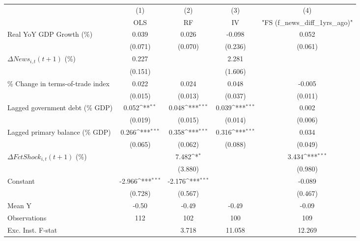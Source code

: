 {
\def\sym#1{\ifmmode^{#1}\else\(^{#1}\)\fi}
\begin{tabular}{l*{4}{c}}
\toprule
                    &\multicolumn{1}{c}{(1)}&\multicolumn{1}{c}{(2)}&\multicolumn{1}{c}{(3)}&\multicolumn{1}{c}{(4)}\\
                    &\multicolumn{1}{c}{OLS}&\multicolumn{1}{c}{RF}&\multicolumn{1}{c}{IV}&\multicolumn{1}{c}{ "FS (f_news_diff_1yrs_ago)" }\\
\midrule
Real YoY GDP Growth (\%)&       0.039         &       0.026         &      -0.098         &       0.052         \\
                    &     (0.071)         &     (0.070)         &     (0.236)         &     (0.061)         \\
\addlinespace
$ \Delta News_{i,t}(t+1)$ (\%)&       0.227         &                     &       2.281         &                     \\
                    &     (0.151)         &                     &     (1.606)         &                     \\
\addlinespace
\% Change in terms-of-trade index&       0.022         &       0.024         &       0.048         &      -0.005         \\
                    &     (0.015)         &     (0.013)         &     (0.037)         &     (0.011)         \\
\addlinespace
Lagged government debt (\% GDP)&       0.052\sym{**} &       0.048\sym{***}&       0.039\sym{***}&       0.002         \\
                    &     (0.019)         &     (0.015)         &     (0.014)         &     (0.006)         \\
\addlinespace
Lagged primary balance (\% GDP)&       0.266\sym{***}&       0.358\sym{***}&       0.316\sym{***}&       0.034         \\
                    &     (0.065)         &     (0.062)         &     (0.088)         &     (0.049)         \\
\addlinespace
$ \Delta FctShock_{i,t}(t+1)$ (\%)&                     &       7.482\sym{*}  &                     &       3.434\sym{***}\\
                    &                     &     (3.880)         &                     &     (0.980)         \\
\addlinespace
Constant            &      -2.966\sym{***}&      -2.176\sym{***}&                     &      -0.089         \\
                    &     (0.728)         &     (0.567)         &                     &     (0.467)         \\
\midrule
Mean Y              &       -0.50         &       -0.49         &       -0.49         &       -0.09         \\
Observations        &         112         &         102         &         100         &         109         \\
Exc. Inst. F-stat   &                     &       3.718         &      11.058         &      12.269         \\
\bottomrule
\end{tabular}
}
